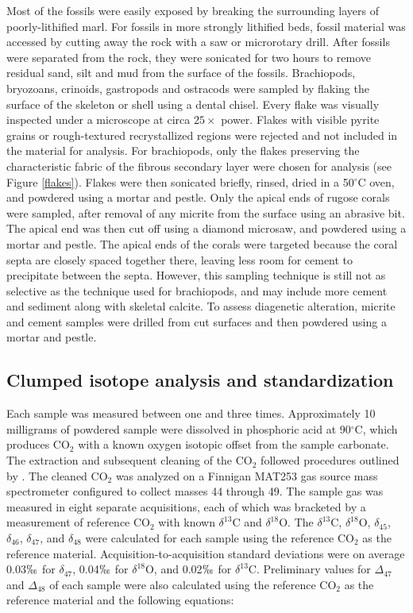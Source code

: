 \documentclass{article}
\newcommand{\deltao}{$\delta^{18}$}
\newcommand{\deltac}{$\delta^{13}$}
\newcommand{\degrees}{$^{\circ}$}
\begin{document}
Most of the fossils were easily exposed by breaking the surrounding layers of poorly-lithified marl. For fossils in more strongly lithified beds, fossil material was accessed by cutting away the rock with a saw or microrotary drill. After fossils were separated from the rock, they were sonicated for two hours to remove residual sand, silt and mud from the surface of the fossils. Brachiopods, bryozoans, crinoids, gastropods and ostracods were sampled by flaking the surface of the skeleton or shell using a dental chisel. Every flake was visually inspected under a microscope at circa $25\times$ power. Flakes with visible pyrite grains or rough-textured recrystallized regions were rejected and not included in the material for analysis. For brachiopods, only the flakes preserving the characteristic fabric of the fibrous secondary layer were chosen for analysis (see Figure \ref{flakes}). Flakes were then sonicated briefly, rinsed, dried in a 50\degrees C oven, and powdered using a mortar and pestle. Only the apical ends of rugose corals were sampled, after removal of any micrite from the surface using an abrasive bit. The apical end was then cut off using a diamond microsaw, and powdered using a mortar and pestle. The apical ends of the corals were targeted because the coral septa are closely spaced together there, leaving less room for cement to precipitate between the septa. However, this sampling technique is still not as selective as the technique used for brachiopods, and may include more cement and sediment along with skeletal calcite. To assess diagenetic alteration, micrite and cement samples were drilled from cut surfaces and then powdered using a mortar and pestle. 

\subsection{Clumped isotope analysis and standardization}

Each sample was measured between one and three times. Approximately 10 milligrams of powdered sample were dissolved in phosphoric acid at 90\degrees C, which produces CO$_2$ with a known oxygen isotopic offset from the sample carbonate. The extraction and subsequent cleaning of the CO$_2$ followed procedures outlined by \cite{Ghosh2006}. The cleaned CO$_2$ was analyzed on a Finnigan MAT253 gas source mass spectrometer configured to collect masses 44 through 49. The sample gas was measured in eight separate acquisitions, each of which was bracketed by a measurement of reference CO$_2$ with known \deltac C and \deltao O. The \deltac C, \deltao O, $\delta_{45}$, $\delta_{46}$, $\delta_{47}$, and $\delta_{48}$ were calculated for each sample using the reference CO$_2$ as the reference material. Acquisition-to-acquisition standard deviations were on average 0.03$\permil$ for $\delta_{47}$, 0.04$\permil$ for \deltao O, and 0.02$\permil$ for \deltac C. Preliminary values for $\Delta_{47}$ and $\Delta_{48}$ of each sample were also calculated using the reference CO$_2$ as the reference material and the following equations:
\end{document}
